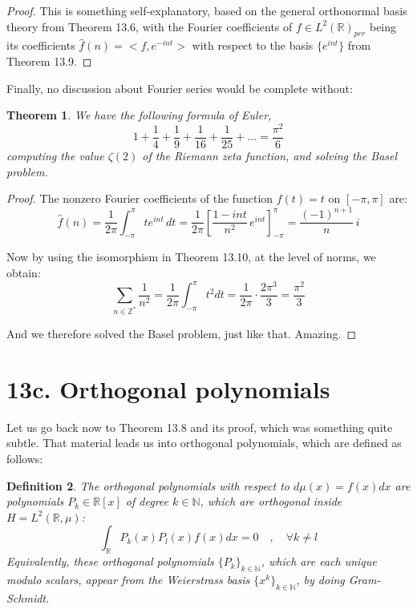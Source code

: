 \documentclass[12pt]{amsbook}
\newtheorem{theorem}{Theorem}[chapter]
\newtheorem{definition}[theorem]{Definition}
\begin{document}
\begin{proof}
This is something self-explanatory, based on the general orthonormal basis theory from Theorem 13.6, with the Fourier coefficients of $f\in L^2(\mathbb R)_{per}$ being its coefficients $\widehat{f}(n)=<f,e^{-int}>$ with respect to the basis $\{e^{int}\}$ from Theorem 13.9.
\end{proof}

Finally, no discussion about Fourier series would be complete without:

\begin{theorem}
We have the following formula of Euler,
$$1+\frac{1}{4}+\frac{1}{9}+\frac{1}{16}+\frac{1}{25}+\ldots=\frac{\pi^2}{6}$$
computing the value $\zeta(2)$ of the Riemann zeta function, and solving the Basel problem.
\end{theorem}

\begin{proof}
The nonzero Fourier coefficients of the function $f(t)=t$ on $[-\pi,\pi]$ are:
$$\widehat{f}(n)
=\frac{1}{2\pi}\int_{-\pi}^\pi te^{int}\,dt
=\frac{1}{2\pi}\left[\frac{1-int}{n^2}\,e^{int}\right]_{-\pi}^\pi
=\frac{(-1)^{n+1}}{n}\,i$$

Now by using the isomorphism in Theorem 13.10, at the level of norms, we obtain:
$$\sum_{n\in\mathbb Z^*}\frac{1}{n^2}=\frac{1}{2\pi}\int_{-\pi}^\pi t^2dt=\frac{1}{2\pi}\cdot\frac{2\pi^3}{3}=\frac{\pi^2}{3}$$

And we therefore solved the Basel problem, just like that. Amazing.
\end{proof}

\section*{13c. Orthogonal polynomials}

Let us go back now to Theorem 13.8 and its proof, which was something quite subtle. That material leads us into orthogonal polynomials, which are defined as follows:


\begin{definition}
The orthogonal polynomials with respect to $d\mu(x)=f(x)dx$ are polynomials $P_k\in\mathbb R[x]$ of degree $k\in\mathbb N$, which are orthogonal inside $H=L^2(\mathbb R,\mu)$:
$$\int_\mathbb RP_k(x)P_l(x)f(x)dx=0\quad,\quad\forall k\neq l$$
Equivalently, these orthogonal polynomials $\{P_k\}_{k\in\mathbb N}$, which are each unique modulo scalars, appear from the Weierstrass basis $\{x^k\}_{k\in\mathbb N}$, by doing Gram-Schmidt.
\end{definition}
\end{document}

